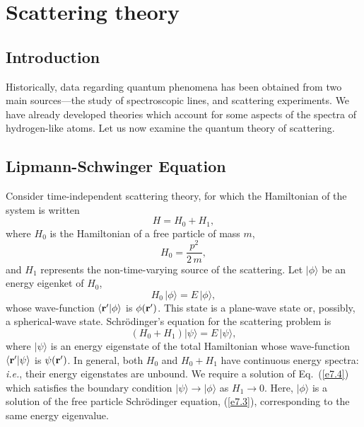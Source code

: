 \chapter{Scattering theory}
\section{Introduction}
Historically,  data regarding quantum phenomena has been
obtained from two main sources---the study of spectroscopic lines,
and scattering experiments. 
We have already developed theories which account
for some aspects of the spectra  of hydrogen-like atoms.
Let us now examine the quantum theory of
scattering. 

\section{Lipmann-Schwinger Equation}
Consider time-independent scattering theory, for which the Hamiltonian
of the system is written
\begin{equation}
H= H_0 + H_1,
\end{equation}
where $H_0$ is the Hamiltonian of a free particle of mass $m$,
\begin{equation}
H_0 = \frac{p^2}{2\,m},
\end{equation}
and $H_1$ represents the non-time-varying source of the scattering. Let $|\phi\rangle$
be an energy eigenket of $H_0$,
\begin{equation}\label{e7.3}
H_0\, |\phi\rangle = E\, |\phi\rangle,
\end{equation}
whose wave-function $\langle {\bf r}'|\phi\rangle$ is
$\phi({\bf r}')$. This state is   a plane-wave state or, possibly, a
spherical-wave state. 
Schr\"{o}dinger's equation for the scattering problem is
\begin{equation}\label{e7.4}
(H_0 + H_1) |\psi\rangle = E\,|\psi\rangle,
\end{equation}
where $|\psi\rangle$ is an energy eigenstate of the total Hamiltonian
whose wave-function $\langle {\bf r}'|\psi\rangle$ is $\psi({\bf r}')$. 
In general, both $H_0$ and $H_0 + H_1$ have continuous energy
spectra: {\em i.e.}, their  energy eigenstates are unbound.
We require a solution of Eq.~(\ref{e7.4}) which satisfies the
boundary condition $|\psi\rangle \rightarrow |\phi\rangle$ as
$H_1\rightarrow 0$. Here, $|\phi\rangle$ is a solution of the free particle
Schr\"{o}dinger equation, (\ref{e7.3}), corresponding to the same energy eigenvalue.

